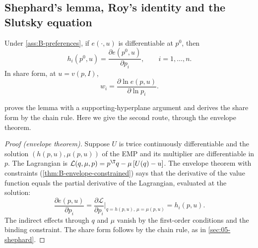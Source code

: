 \subsection{Shephard's lemma, Roy's identity and the Slutsky equation}\label{sec:B-shephard}

\begin{proposition}\label{prop:B-shephard}
Under \cref{ass:B-preferences}, if $e(\cdot, u)$ is differentiable at $p^0$, then
\begin{equation}\label{eq:B-shephard}
h_i(p^0, u) = \frac{\partial e(p^0, u)}{\partial p_i}, \qquad i = 1, \dots, n .
\end{equation}
In share form, at $u = v(p, I)$,
\begin{equation}\label{eq:B-shephard-share}
w_i = \frac{\partial\ln e(p, u)}{\partial\ln p_i} .
\end{equation}
\end{proposition}

 proves the lemma with a supporting-hyperplane argument and derives the share form by
the chain rule. Here we give the second route, through the envelope theorem.

\begin{proof}[Proof (envelope theorem)]
Suppose $U$ is twice continuously differentiable and the solution $(h(p, u), \mu(p, u))$ of the EMP and
its multiplier are differentiable in $p$. The Lagrangian is
$\mathcal{L}(q, \mu, p) = p^\T q - \mu\,[U(q) - u]$. The envelope theorem with constraints
(\cref{thm:B-envelope-constrained}) says that the derivative of the value function equals the partial
derivative of the Lagrangian, evaluated at the solution:
\begin{equation*}
\frac{\partial e(p, u)}{\partial p_i} = \frac{\partial\mathcal{L}}{\partial p_i}\Big|_{q = h(p, u),\,\mu = \mu(p, u)}
= h_i(p, u).
\end{equation*}
The indirect effects through $q$ and $\mu$ vanish by the first-order conditions and the binding
constraint. The share form follows by the chain rule, as in \cref{sec:05-shephard}.
\end{proof}

